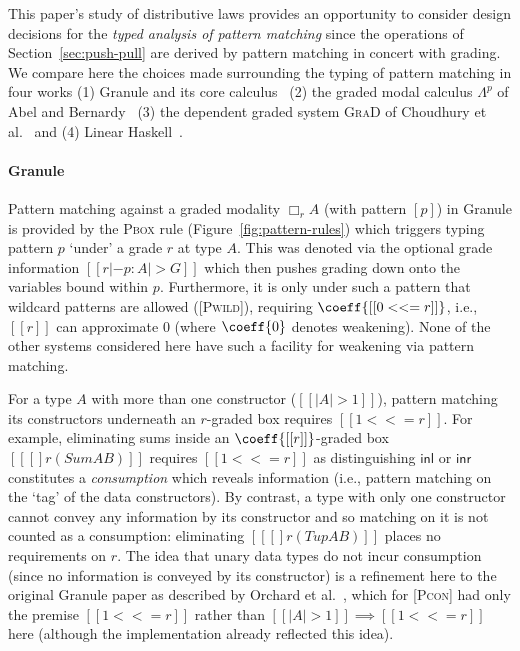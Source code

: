 
 \newcommand{\abname}{$\Lambda^p$}
 \newcommand{\gradname}{\textsc{GraD}}
 
 This paper's study of distributive laws provides
 an opportunity to consider design decisions for the \emph{typed
   analysis of pattern matching} since the operations of
 Section~\ref{sec:push-pull} are derived by pattern matching in concert
 with grading. We compare here the choices made surrounding the typing of
 pattern matching in four works (1) Granule and
 its core calculus~\cite{DBLP:journals/pacmpl/OrchardLE19} (2) the graded
 modal calculus \abname{} of Abel and Bernardy~\cite{abel-barnardy-icfp2020} (3) the dependent graded system
 \gradname{} of Choudhury et al.~\cite{choudhury2021} and (4) Linear
 Haskell~\cite{linear-haskell}.
 
 \paragraph{Granule}
 Pattern matching against a graded modality $\Box_r A$ (with pattern
 $[p]$) in Granule is provided by the \textsc{Pbox} rule
 (Figure~\ref{fig:pattern-rules}) which triggers typing pattern $p$
 `under' a grade $r$ at type $A$. This was denoted via the optional grade information
 $[[ r |- p : A |> G ]]$ which then pushes grading down onto the
 variables bound within $p$. Furthermore, it is only under such a
 pattern that wildcard patterns are allowed (\textsc{[Pwild]}),
 requiring $\coeff{[[ 0 <<= r]]}$, i.e., $[[ r ]]$ can approximate
 $0$ (where $\coeff{0}$ denotes weakening).
 None of the other systems considered here have such a facility
 for weakening via pattern matching.
 
 For a type $A$ with more than one
   constructor ($[[ | A | > 1 ]]$), pattern matching its
   constructors underneath an $r$-graded box requires $[[ 1 <<=
   r]]$. For example, eliminating sums inside an $\coeff{[[r]]}$-graded box
 $[[ [] r (Sum A B) ]]$ requires $[[ 1 <<= r ]]$ as
 distinguishing $\mathsf{inl}$ or $\mathsf{inr}$
 constitutes a \emph{consumption} which reveals information (i.e.,
 pattern matching on the `tag' of the data constructors).
 By contrast, a type with only one constructor cannot convey any information
 by its constructor and so matching on it is not counted as a consumption:
 eliminating $[[ [] r (Tup A B) ]]$ places no
 requirements on $r$.
 The idea that unary data types do not incur consumption (since no
 information is conveyed by its constructor) is a refinement here to the
 original Granule paper as described by Orchard et
 al.~\cite{DBLP:journals/pacmpl/OrchardLE19}, which for \textsc{[Pcon]}
 had only the premise $[[ 1 <<= r]]$ rather than
 $[[ | A | > 1 ]] \implies [[ 1 <<= r ]]$ here (although the
 implementation already reflected this idea).
 
